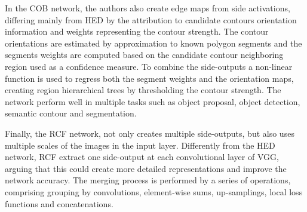 In the COB network, the authors also create edge maps from side activations, differing mainly from HED by the attribution to candidate contours orientation information and weights representing the contour strength. The contour orientations are estimated by approximation to known polygon segments and the segments weights are computed based on the candidate contour neighboring region used as a confidence measure. To combine the side-outputs a non-linear function is used to regress both the segment weights and the orientation maps, creating region hierarchical trees by thresholding the contour strength. The network perform well in multiple tasks such as object proposal, object detection, semantic contour and segmentation.


Finally, the RCF network, not only creates multiple side-outputs, but also uses multiple scales of the images in the input layer. Differently from the HED network, RCF extract one side-output at each convolutional layer of VGG, arguing that  this could create more detailed representations and improve the network accuracy. The merging process is performed by a series of operations, comprising grouping by convolutions, element-wise sums, up-samplings, local loss functions and concatenations.  






